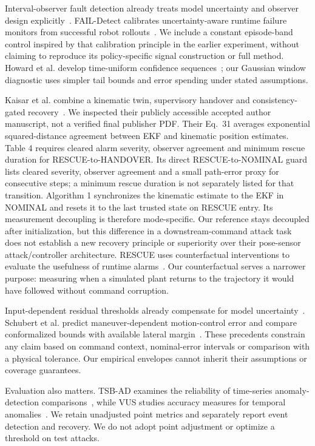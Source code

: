 \documentclass[11pt,twocolumn]{article}
\begin{document}
Interval-observer fault detection already treats model uncertainty and observer design explicitly~\cite{interval}. FAIL-Detect calibrates uncertainty-aware runtime failure monitors from successful robot rollouts~\cite{fail}. We include a constant episode-band control inspired by that calibration principle in the earlier experiment, without claiming to reproduce its policy-specific signal construction or full method. Howard et al. develop time-uniform confidence sequences~\cite{howard}; our Gaussian window diagnostic uses simpler tail bounds and error spending under stated assumptions.

Kaisar et al. combine a kinematic twin, supervisory handover and consistency-gated recovery~\cite{kaisar}. We inspected their publicly accessible accepted author manuscript, not a verified final publisher PDF. Their Eq.\ 31 averages exponential squared-distance agreement between EKF and kinematic position estimates. Table 4 requires cleared alarm severity, observer agreement and minimum rescue duration for RESCUE-to-HANDOVER. Its direct RESCUE-to-NOMINAL guard lists cleared severity, observer agreement and a small path-error proxy for consecutive steps; a minimum rescue duration is not separately listed for that transition. Algorithm 1 synchronizes the kinematic estimate to the EKF in NOMINAL and resets it to the last trusted state on RESCUE entry. Its measurement decoupling is therefore mode-specific. Our reference stays decoupled after initialization, but this difference in a downstream-command attack task does not establish a new recovery principle or superiority over their pose-sensor attack/controller architecture. RESCUE uses counterfactual interventions to evaluate the usefulness of runtime alarms~\cite{rescue}. Our counterfactual serves a narrower purpose: measuring when a simulated plant returns to the trajectory it would have followed without command corruption.

Input-dependent residual thresholds already compensate for model uncertainty~\cite{inputthreshold}. Schubert et al. predict maneuver-dependent motion-control error and compare conformalized bounds with available lateral margin~\cite{motionconformal}. These precedents constrain any claim based on command context, nominal-error intervals or comparison with a physical tolerance. Our empirical envelopes cannot inherit their assumptions or coverage guarantees.

Evaluation also matters. TSB-AD examines the reliability of time-series anomaly-detection comparisons~\cite{tsbad}, while VUS studies accuracy measures for temporal anomalies~\cite{vus}. We retain unadjusted point metrics and separately report event detection and recovery. We do not adopt point adjustment or optimize a threshold on test attacks.
\end{document}
